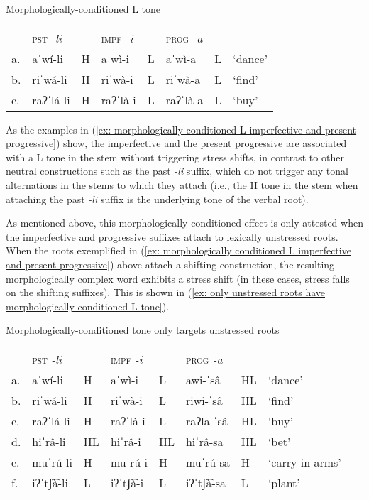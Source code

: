 \ea\label{ex: morphologically conditioned L imperfective and present progressive}
{Morphologically-conditioned L tone}

\begin{tabular}{llllllll}
        & \textsc{pst} \textit{-li} & & {\textsc{impf} \textit{-i}} & & {\textsc{prog} \textit{-a}} & &\\
     a. &  {aˈwí-li} &  H & aˈwì-i	& L & {aˈwì-a} & L & `dance'\\
     b. & {riˈwá-li} & H & {riˈwà-i} & L & {riˈwà-a} & L & {`find'}\\
     c. & {raʔˈlá-li} & H & {raʔˈlà-i} & L & {raʔˈlà-a} & L & {`buy'}\\
\end{tabular}
    \z


As the examples in (\ref{ex: morphologically conditioned L imperfective and present progressive}) show, the imperfective and the present progressive are associated with a L tone in the stem without triggering stress shifts, in contrast to other neutral constructions such as the past \textit{-li} suffix, which do not trigger any tonal alternations in the stems to which they attach (i.e., the H tone in the stem when attaching the past \textit{-li} suffix is the underlying tone of the verbal root).

As mentioned above, this morphologically-conditioned effect is only attested when the imperfective and progressive suffixes attach to lexically unstressed roots. When the roots exemplified in (\ref{ex: morphologically conditioned L imperfective and present progressive}) above attach a shifting construction, the resulting morphologically complex word exhibits a stress shift (in these cases, stress falls on the shifting suffixes). This is shown in (\ref{ex: only unstressed roots have morphologically conditioned L tone}).

\ea\label{ex: only unstressed roots have morphologically conditioned L tone}
{Morphologically-conditioned tone only targets unstressed roots}

\begin{tabular}{llllllll}
      & \textsc{pst} \textit{-li} & & {\textsc{impf} \textit{-i}} & & {\textsc{prog} \textit{-a}} & &\\
     a. & aˈwí-li & H & {aˈwì-i} & L & {awi-ˈsâ} & HL & {‘dance’}\\
     b. & {riˈwá-li} & H & {riˈwà-i} &	{L} & {riwi-ˈsâ} & {HL} & {‘find’}    \\
     c. & raʔˈlá-li & H & {raʔˈlà-i} &	L & {raʔla-ˈsâ} &  HL & {`buy'}\\
     d. & {hiˈrâ-li} & HL & {hiˈrâ-i} & HL & {hiˈrâ-sa} & HL & {`bet'}\\
     e. & {muˈrú-li} & H & {muˈrú-i} & H & {muˈrú-sa} & H & {`carry in arms'}\\
     f. & {iʔˈtʃ͡à-li} & L & {iʔˈtʃ͡à-i} & L & {iʔˈtʃ͡à-sa} & L & {`plant'}\\
\end{tabular}
    \z

